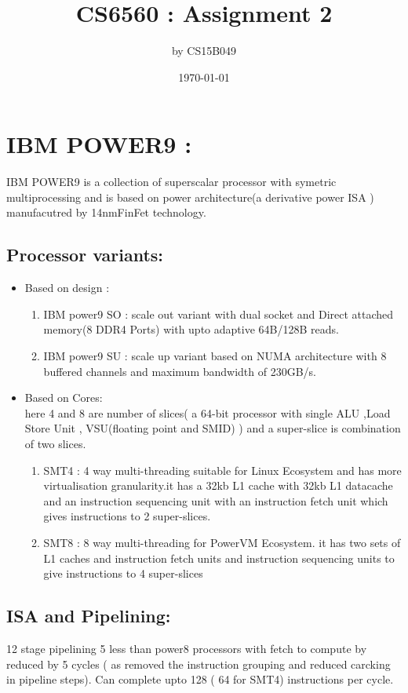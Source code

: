\documentclass[a4paper,10pt]{article}
\title{CS6560 : Assignment 2 }
\author{by CS15B049}
\date{\today}
\begin{document}
\maketitle

\section{IBM POWER9 :}
IBM POWER9 is a collection of superscalar processor with symetric multiprocessing and is based on power architecture(a derivative power ISA ) manufacutred by 14nmFinFet technology.
\subsection{ Processor variants: }
\begin{itemize}
     \item Based on design :
     \begin{enumerate}
     \item  IBM power9 SO : scale out variant with dual socket and Direct attached memory(8 DDR4 Ports) with upto adaptive 64B/128B reads.
     \item IBM power9 SU : scale up variant based on NUMA architecture with 8 buffered channels and maximum bandwidth of 230GB/s.
    \end{enumerate}
    
  \item Based on Cores:\\
  here 4 and 8 are number of slices( a 64-bit processor with single ALU ,Load Store Unit , VSU(floating point and SMID) ) and a super-slice is combination of two slices.
  \begin{enumerate}
     \item SMT4 : 4 way multi-threading  suitable for Linux Ecosystem and has more virtualisation granularity.it has a 32kb L1 cache with 32kb L1 datacache and an instruction sequencing unit with an instruction fetch unit which gives instructions to 2 super-slices.\\
     \item SMT8 : 8 way multi-threading for PowerVM Ecosystem. it has two sets of L1 caches and instruction fetch units and instruction sequencing units to give instructions to 4 super-slices
    \end{enumerate}
\end{itemize}

\subsection{ ISA and Pipelining:}
12 stage pipelining 5 less than power8 processors with fetch to compute by reduced by 5 cycles ( as removed the instruction grouping and reduced carcking in pipeline steps). Can complete upto 128 ( 64 for SMT4) instructions per cycle. 
\end{document}
